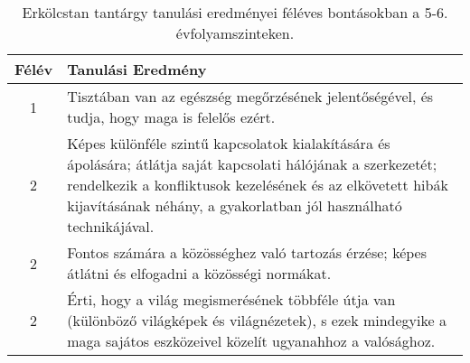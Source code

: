       
           \begin{longtable}{c | p{12cm} }
            \caption[Erkölcstan 5-6.]{Erkölcstan tantárgy tanulási eredményei féléves bontásokban a 5-6. évfolyamszinteken. }  \\

            \textbf{Félév} & \textbf{Tanulási Eredmény} \\
            \hline
            \endhead
                                
                                          1 &  Tisztában van az egészség megőrzésének jelentőségével, és tudja, hogy maga is felelős ezért. \\ \hline
                                      
                                
                                          2 &  Képes különféle szintű kapcsolatok kialakítására és ápolására; átlátja saját kapcsolati hálójának a szerkezetét; rendelkezik a konfliktusok kezelésének és az elkövetett hibák kijavításának néhány, a gyakorlatban jól használható technikájával. \\ \hline
                                          2 &  Fontos számára a közösséghez való tartozás érzése; képes átlátni és elfogadni a közösségi normákat. \\ \hline
                                          2 &  Érti, hogy a világ megismerésének többféle útja van (különböző világképek és világnézetek), s ezek mindegyike a maga sajátos eszközeivel közelít ugyanahhoz a valósághoz. \\ \hline
                                      

\end{longtable}
